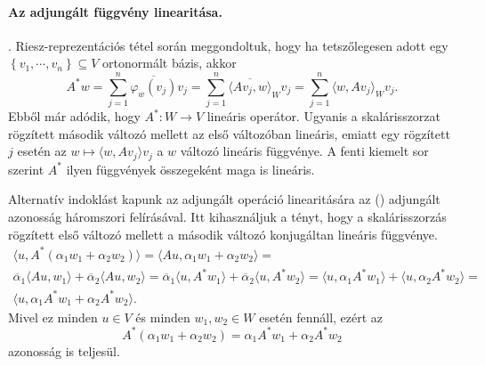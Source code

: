 \documentclass[9pt, a4paper, showtrims]{memoir}
\let\Aref\relax
\theoremstyle{plain}
\theoremstyle{remark}
\theoremstyle{definition}
\newcommand{\ip}[2]{\langle#1,#2\rangle}
\begin{document}
\paragraph{Az adjungált függvény linearitása.}
\Aref{pr:Riesz}. Riesz-reprezentációs tétel során meggondoltuk, 
hogy ha tetszőlegesen adott egy
    $\left\{ v_1,\cdots,v_n \right\}\subseteq V$
ortonormált bázis, akkor 
    \[
        A^\ast w
        =
        \sum_{j=1}^n\overline{\varphi_w\left( v_j \right)}v_j
        =
        \sum_{j=1}^n\overline{\ip{Av_j}{w}}_Wv_j
        =
        \sum_{j=1}^n\ip{w}{Av_j}_Wv_j.
    \]
Ebből már adódik, hogy $A^\ast:W\to V$ lineáris operátor.
Ugyanis a skalárisszorzat rögzített második változó mellett az első változóban lineáris,
emiatt egy rögzített $j$ esetén az $w\mapsto \ip{w}{Av_j}v_j$ a $w$ változó lineáris függvénye. A fenti kiemelt sor szerint $A^\ast$ ilyen függvények összegeként maga is lineáris.

Alternatív indoklást kapunk az adjungált operáció linearitására az (\dag) adjungált azonosság háromszori felírásával.
Itt kihasználjuk a tényt, hogy a skalárisszorzás rögzített első változó mellett a második változó konjugáltan lineáris függvénye.
\begin{multline*}
    \ip{u}{A^\ast\left( \alpha_1w_1+\alpha_2w_2 \right)}
    =
    \ip{Au}{\alpha_1w_1+\alpha_2w_2}
    =\\
    \overline{\alpha}_1\ip{Au}{w_1}+\overline{\alpha}_2\ip{Au}{w_2}
    =
    \overline{\alpha}_1\ip{u}{A^\ast w_1}+\overline{\alpha}_2\ip{u}{A^\ast w_2}
    =
    \ip{u}{\alpha_1 A^\ast w_1}+\ip{u}{\alpha_2 A^\ast w_2}
    =\\
    \ip{u}{\alpha_1 A^\ast w_1+\alpha_2 A^\ast w_2}.
\end{multline*}
Mivel ez minden $u\in V$ és minden $w_1,w_2\in W$ esetén fennáll, 
ezért az
\begin{displaymath}
    A^\ast\left( \alpha_1w_1+\alpha_2w_2 \right)
    =
    \alpha_1A^\ast w_1+ \alpha_2A^\ast w_2
\end{displaymath}
azonosság is teljesül.
\end{document}
